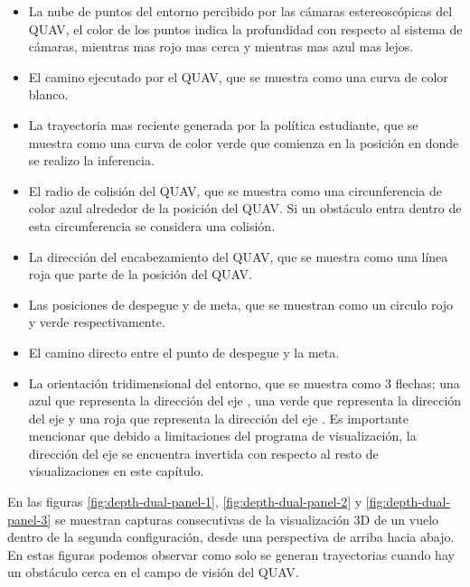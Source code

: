 \begin{itemize}
    \item La nube de puntos del entorno percibido por las cámaras estereoscópicas del QUAV, el color de los puntos indica la profundidad con respecto al sistema de cámaras, mientras mas rojo mas cerca y mientras mas azul mas lejos.
    \item El camino ejecutado por el QUAV, que se muestra como una curva de color blanco.
    \item La trayectoria mas reciente generada por la política estudiante, que se muestra como una curva de color verde que comienza en la posición en donde se realizo la inferencia.
    \item El radio de colisión del QUAV, que se muestra como una circunferencia de color azul alrededor de la posición del QUAV. Si un obstáculo entra dentro de esta circunferencia se considera una colisión.
    \item La dirección del encabezamiento del QUAV, que se muestra como una línea roja que parte de la posición del QUAV.
    \item Las posiciones de despegue y de meta, que se muestran como un circulo rojo y verde respectivamente.
    \item El camino directo entre el punto de despegue y la meta.
    \item La orientación tridimensional del entorno, que se muestra como 3 flechas; una azul que representa la dirección del eje , una verde que representa la dirección del eje  y una roja que representa la dirección del eje . Es importante mencionar que debido a limitaciones del programa de visualización, la dirección del eje  se encuentra invertida con respecto al resto de visualizaciones en este capítulo.
\end{itemize}

En las figuras \ref{fig:depth-dual-panel-1}, \ref{fig:depth-dual-panel-2} y \ref{fig:depth-dual-panel-3} se muestran capturas consecutivas de la visualización 3D de un vuelo dentro de la segunda configuración, desde una perspectiva de arriba hacia abajo. En estas figuras podemos observar como solo se generan trayectorias cuando hay un obstáculo cerca en el campo de visión del QUAV.

